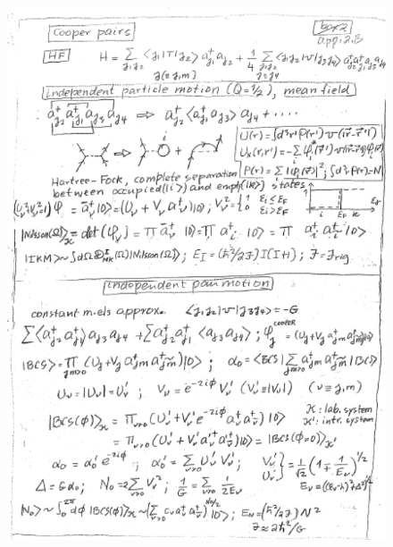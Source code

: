 \documentclass[a4paper,11pt]{book}
\numberwithin{equation}{section}
\numberwithin{figure}{section}
\numberwithin{table}{section}
\begin{document}
\begin{figure}
\centerline{\includegraphics*[width=\textwidth,angle=0]{figs/box2_1.pdf}}
\end{figure}
\end{document}
